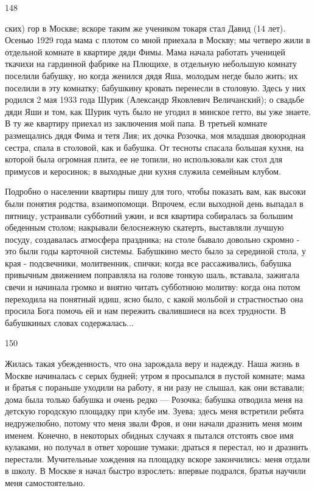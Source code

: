 148

ских) гор в Москве; вскоре таким же учеником токаря стал Давид (14 лет). Осенью 1929 года мама с плотом со мной приехала в Москву; мы четверо жили в отдельной комнате в квартире дяди Фимы. Мама начала работать ученицей ткачихи на гардинной фабрике на Плющихе, в отдельную небольшую комнату поселили бабушку, но когда женился дядя Яша, молодым негде было жить; их поселили в эту комнатку; бабушкину кровать перенесли в столовую. Здесь у них родился 2 мая 1933 года Шурик (Александр Яковлевич Величанский); о свадьбе дяди Яши и том, как Шурик чуть было не угодил в минское гетто, вы уже знаете. В ту же квартиру приехал из заключения мой папа. В третьей комнате размещались дядя Фима и тетя Лия; их дочка Розочка, моя младшая двоюродная сестра, спала в столовой, как и бабушка. От тесноты спасала большая кухня, на которой была огромная плита, ее не топили, но использовали как стол для примусов и керосинок; в выходные дни кухня служила семейным клубом.

Подробно о населении квартиры пишу для того, чтобы показать вам, как высоки были понятия родства, взаимопомощи. Впрочем, если выходной день выпадал в пятницу, устраивали субботний ужин, и вся квартира собиралась за большим обеденным столом; накрывали белоснежную скатерть, выставляли лучшую посуду, создавалась атмосфера праздника; на столе бывало довольно скромно - это были годы карточной системы. Бабушкино место было за серединой стола, у края - подсвечники, молитвенник, спички; когда все рассаживались, бабушка привычным движением поправляла на голове тонкую шаль, вставала, зажигала свечи и начинала громко и внятно читать субботнюю молитву: когда она потом переходила на понятный идиш, ясно было, с какой мольбой и страстностью она просила Бога помочь ей и нам пережить свалившиеся на всех трудности. В бабушкиных словах содержалась...

150

Жилась такая убежденность, что она зарождала веру и надежду. Наша жизнь в Москве начиналась с серых будней; утром я просыпался в пустой комнате; мама и братья с пораньше уходили на работу, я ни разу не слышал, как они вставали; дома была только бабушка и очень редко — Розочка; бабушка отводила меня на детскую городскую площадку при клубе им. Зуева; здесь меня встретили ребята недружелюбно, потому что меня звали Фроя, и они начали дразнить меня моим именем. Конечно, в некоторых обидных случаях я пытался отстоять свое имя кулаками, но получал в ответ хорошие тумаки; драться я перестал, но и дразнить перестали. Мучительные хождения на площадку вскоре закончились: меня отдали в школу. В Москве я начал быстро взрослеть: впервые подрался, братья научили меня самостоятельно.

